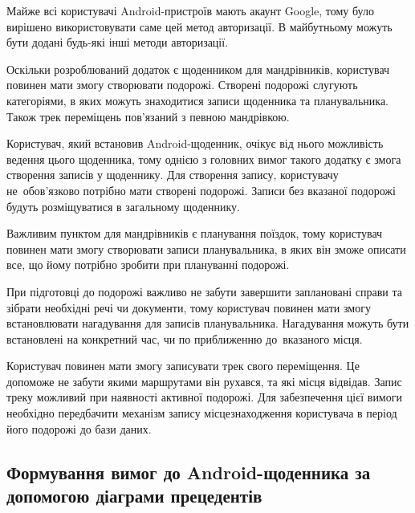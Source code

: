 \documentclass[../main.tex]{subfiles}
\begin{document}
Майже всі користувачі Android-пристроїв мають акаунт Google, тому було вирішено використовувати саме цей метод авторизації. В майбутньому можуть бути додані будь-які інші методи авторизації.

Оскільки розроблюваний додаток є щоденником для мандрівників, користувач повинен мати змогу створювати подорожі. Створені подорожі слугують категоріями, в яких можуть знаходитися записи щоденника та планувальника. Також трек переміщень пов'язаний з певною мандрівкою.

Користувач, який встановив Android-щоденник, очікує від нього можливість ведення цього щоденника, тому однією з головних вимог такого додатку є змога створення записів у щоденнику. Для створення запису, користувачу не~обов'язково потрібно мати створені подорожі. Записи без вказаної подорожі будуть розміщуватися в загальному щоденнику.

Важливим пунктом для мандрівників є планування поїздок, тому користувач повинен мати змогу створювати записи планувальника, в яких він зможе описати все, що йому потрібно зробити при плануванні подорожі.

При підготовці до подорожі важливо не забути завершити заплановані справи та зібрати необхідні речі чи документи, тому користувач повинен мати змогу встановлювати нагадування для записів планувальника. Нагадування можуть бути встановлені на конкретний час, чи по приближенню до~вказаного місця.

Користувач повинен мати змогу записувати трек свого переміщення. Це допоможе не забути якими маршрутами він рухався, та  які місця відвідав. Запис треку можливий при наявності активної подорожі. Для забезпечення цієї вимоги необхідно передбачити механізм запису місцезнаходження користувача в період його подорожі до бази даних.

\subsection{Формування вимог до Android-щоденника за допомогою діаграми прецедентів}
\end{document}
